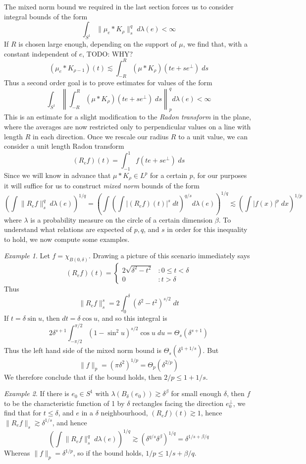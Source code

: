 \documentclass{article}
\theoremstyle{plain}
\theoremstyle{remark}
\newtheorem*{example}{Example}
\theoremstyle{definition}
\begin{document}
The mixed norm bound we required in the last section forces us to consider integral bounds of the form
%
\[ \int_{S^1} \| \mu_e * K_\rho \|_s^q\; d\lambda(e) < \infty \]
%
If $R$ is chosen large enough, depending on the support of $\mu$, we find that, with a constant independent of $e$, TODO: WHY?
%
\[ (\mu_e * K_{\rho - 1})(t) \lesssim \int_{-R}^R (\mu * K_\rho)(t e + s e^\perp)\; ds \]
%
Thus a second order goal is to prove estimates for values of the form
%
\[ \int_{S^1} \left\| \int_{-R}^R (\mu * K_\rho)(te + se^\perp)\; ds \right\|_p^q d\lambda(e) < \infty \]
%
This is an estimate for a slight modification to the {\it Radon transform} in the plane, where the averages are now restricted only to perpendicular values on a line with length $R$ in each direction. Once we rescale our radius $R$ to a unit value, we can consider a unit length Radon transform
%
\[ (R_e f)(t) = \int_{-1}^1 f(te + se^\perp)\; ds \]
%
Since we will know in advance that $\mu * K_\rho \in L^p$ for a certain $p$, for our purposes it will suffice for us to construct {\it mixed norm} bounds of the form
%
\[ \left( \int \| R_e f \|_s^q\; d\lambda(e) \right)^{1/q} = \left( \int \left( \int |(R_e f)(t)|^s\; dt \right)^{q/s} d\lambda(e) \right)^{1/q} \lesssim \left( \int |f(x)|^p\; dx \right)^{1/p} \]
%
where $\lambda$ is a probability measure on the circle of a certain dimension $\beta$. To understand what relations are expected of $p,q$, and $s$ in order for this inequality to hold, we now compute some examples.

\begin{example}
	Let $f = \chi_{B(0,\delta)}$. Drawing a picture of this scenario immediately says
	\[ (R_e f)(t) = \begin{cases} 2 \sqrt{\delta^2 - t^2} &: 0 \leq t < \delta \\ 0 &: t > \delta \end{cases} \]
	Thus
	\[ \| R_e f \|_s^s = 2 \int_0^\delta (\delta^2 - t^2)^{s/2}\; dt \]
	If $t = \delta \sin u$, then $dt = \delta \cos u$, and so this integral is
	\[ 2 \delta^{s+1} \int_{-\pi/2}^{\pi/2} (1 - \sin^2 u)^{s/2} \cos u\; du = \Theta_s(\delta^{s+1}) \]
	Thus the left hand side of the mixed norm bound is $\Theta_s(\delta^{1+1/s})$. But
	\[ \| f \|_p = (\pi \delta^2)^{1/p} = \Theta_p(\delta^{2/p}) \]
	We therefore conclude that if the bound holds, then $2/p \leq 1 + 1/s$.
\end{example}

\begin{example}
	If there is $e_0 \in S^1$ with $\lambda(B_\delta(e_0)) \gtrsim \delta^\beta$ for small enough $\delta$, then $f$ to be the characteristic function of 1 by $\delta$ rectangles facing the direction $e_0^\perp$, we find that for $t \leq \delta$, and $e$ in a $\delta$ neighbourhood, $(R_ef)(t) \gtrsim 1$, hence $\| R_e f \|_s \gtrsim \delta^{1/s}$, and hence
	\[ \left( \int \| R_e f \|_s^q\; d\lambda(e) \right)^{1/q} \gtrsim (\delta^{q/s} \delta^\beta)^{1/q} = \delta^{1/s + \beta/q} \]
	Whereas $\| f \|_p = \delta^{1/p}$, so if the bound holds, $1/p \leq 1/s + \beta/q$.
\end{example}
\end{document}
